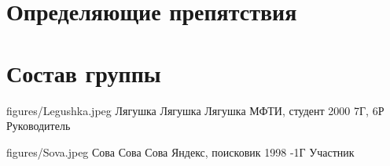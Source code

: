 \section{Определяющие препятствия}
\begin{obstacletable}
\end{obstacletable}

\section{Состав группы}

\addparticipant
{figures/Legushka.jpeg}
{Лягушка Лягушка Лягушка}
{МФТИ, студент}
{2000}
{7Г, 6Р}
{Руководитель}

\addparticipant
{figures/Sova.jpeg}
{Сова Сова Сова}
{Яндекс, поисковик}
{1998}
{-1Г}
{Участник}

\printparticipants